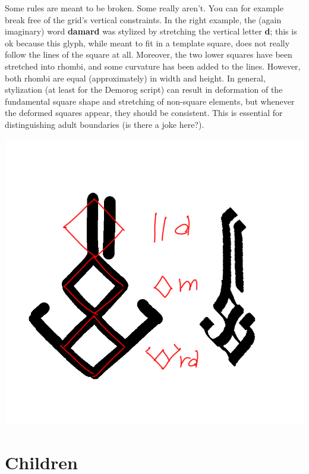 \documentclass[10pt,oneside]{memoir}
\begin{document}
\begin{minipage}[]{0.5\textwidth}
    Some rules are meant to be broken. Some really aren't. You can for example break free of the grid's vertical constraints. In the right example, the (again imaginary) word \textbf{damard} was stylized by stretching the vertical letter \textbf{d}; this is ok because this glyph, while meant to fit in a template square, does not really follow the lines of the square at all. Moreover, the two lower squares have been stretched into rhombi, and some curvature has been added to the lines. However, both rhombi are equal (approximately) in width and height. In general, stylization (at least for the Demorog script) can result in deformation of the fundamental square shape and stretching of non-square elements, but whenever the deformed squares appear, they should be consistent. This is essential for distinguishing adult boundaries (is there a joke here?).
\end{minipage}
\hfill
\begin{minipage}{0.45\textwidth}
    \centering
    \includegraphics{damard}
\end{minipage}

\vfill

\pagebreak


\section{Children}
\end{document}
